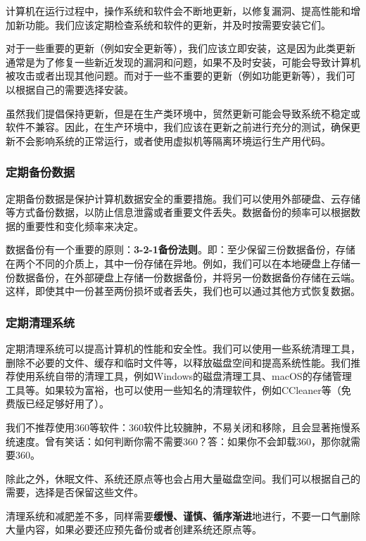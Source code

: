 计算机在运行过程中，操作系统和软件会不断地更新，以修复漏洞、提高性能和增加新功能。我们应该定期检查系统和软件的更新，并及时按需要安装它们。

对于一些重要的更新（例如安全更新等），我们应该立即安装，这是因为此类更新通常是为了修复一些新近发现的漏洞和问题，如果不及时安装，可能会导致计算机被攻击或者出现其他问题。而对于一些不重要的更新（例如功能更新等），我们可以根据自己的需要选择安装。

\begin{caution}
  虽然我们提倡保持更新，但是在生产类环境中，贸然更新可能会导致系统不稳定或软件不兼容。因此，在生产环境中，我们应该在更新之前进行充分的测试，确保更新不会影响系统的正常运行，或者使用虚拟机等隔离环境运行生产用代码。
\end{caution}

\subsubsection{定期备份数据}

定期备份数据是保护计算机数据安全的重要措施。我们可以使用外部硬盘、云存储等方式备份数据，以防止信息泄露或者重要文件丢失。数据备份的频率可以根据数据的重要性和变化频率来决定。

数据备份有一个重要的原则：\textbf{3-2-1备份法则}。即：至少保留三份数据备份，存储在两个不同的介质上，其中一份存储在异地。例如，我们可以在本地硬盘上存储一份数据备份，在外部硬盘上存储一份数据备份，并将另一份数据备份存储在云端。这样，即使其中一份甚至两份损坏或者丢失，我们也可以通过其他方式恢复数据。

\subsubsection{定期清理系统}

定期清理系统可以提高计算机的性能和安全性。我们可以使用一些系统清理工具，删除不必要的文件、缓存和临时文件等，以释放磁盘空间和提高系统性能。我们推荐使用系统自带的清理工具，例如Windows的磁盘清理工具、macOS的存储管理工具等。如果较为富裕，也可以使用一些知名的清理软件，例如CCleaner等（免费版已经足够好用了）。

我们不推荐使用360等软件：360软件比较臃肿，不易关闭和移除，且会显著拖慢系统速度。曾有笑话：如何判断你需不需要360？答：如果你不会卸载360，那你就需要360。

除此之外，休眠文件、系统还原点等也会占用大量磁盘空间。我们可以根据自己的需要，选择是否保留这些文件。

\begin{caution}
  清理系统和减肥差不多，同样需要\textbf{缓慢、谨慎、循序渐进}地进行，不要一口气删除大量内容，如果必要还应预先备份或者创建系统还原点等。
\end{caution}

